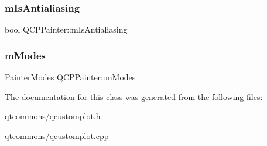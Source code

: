 \mbox{\label{class_q_c_p_painter_a7055085da176aee0f6b23298f1003d08}} 
\subsubsection{\texorpdfstring{mIsAntialiasing}{mIsAntialiasing}}
{\footnotesize\ttfamily bool Q\+C\+P\+Painter\+::m\+Is\+Antialiasing\hspace{0.3cm}{\ttfamily [protected]}}

\mbox{\label{class_q_c_p_painter_af5d1d6e5df0adbc7de5633250fb3396c}} 
\subsubsection{\texorpdfstring{mModes}{mModes}}
{\footnotesize\ttfamily Painter\+Modes Q\+C\+P\+Painter\+::m\+Modes\hspace{0.3cm}{\ttfamily [protected]}}



The documentation for this class was generated from the following files\+:\begin{DoxyCompactItemize}
\item 
qtcommons/\mbox{\hyperlink{qcustomplot_8h}{qcustomplot.\+h}}\item 
qtcommons/\mbox{\hyperlink{qcustomplot_8cpp}{qcustomplot.\+cpp}}\end{DoxyCompactItemize}

